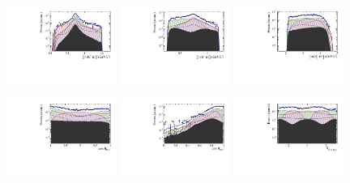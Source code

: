 \begin{figure}[h]
		\includegraphics[width=0.32\textwidth, height = !]{figs/lassoFit/LASSO/m_Kpi_mod_log.pdf} 
		\includegraphics[width=0.32\textwidth, height = !]{figs/lassoFit/LASSO/m_pipi_mod_log.pdf} 
		\includegraphics[width=0.32\textwidth, height = !]{figs/lassoFit/LASSO/m_Dspi_mod_log.pdf} 
		
		\includegraphics[width=0.32\textwidth, height = !]{figs/lassoFit/LASSO/h_cosTheta_Kpi_mod_log.pdf} 
		\includegraphics[width=0.32\textwidth, height = !]{figs/lassoFit/LASSO/h_cosTheta_Dspi_mod_log.pdf} 
		\includegraphics[width=0.32\textwidth, height = !]{figs/lassoFit/LASSO/h_phi_Kpi_Dspi_mod_log.pdf} 

		\caption{} 		
		\label{fig:lassoFit2}
\end{figure}

